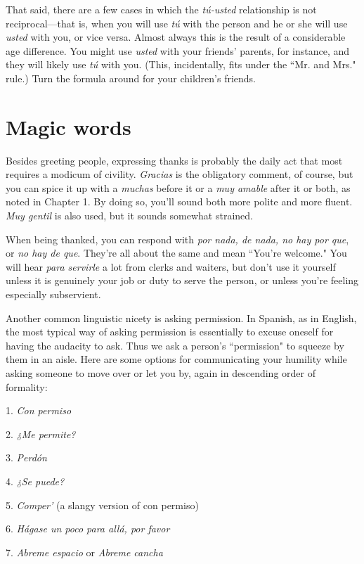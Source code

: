 That said, there are a few cases in which the \emph{tú-usted} relationship is not reciprocal---that is, when you will use \emph{tú} with the person
and he or she will use \emph{usted} with you, or vice versa. Almost always
this is the result of a considerable age difference. You might use \emph{usted}
with your friends' parents, for instance, and they will likely use \emph{tú}
with you. (This, incidentally, fits under the ``Mr. and Mrs." rule.) Turn
the formula around for your children's friends.

\section{Magic words}

Besides greeting people, expressing thanks is probably the
daily act that most requires a modicum of civility. \emph{Gracias} is the
obligatory comment, of course, but you can spice it up with a \emph{muchas}
before it or a \emph{muy amable} after it or both, as noted in Chapter 1. By
doing so, you'll sound both more polite and more fluent. \emph{Muy gentil} is
also used, but it sounds somewhat strained.

When being thanked, you can respond with \emph{por nada, de
	nada, no hay por que}, or \emph{no hay de que}. They're all about the same
and mean ``You're welcome." You will hear \emph{para servirle} a lot from
clerks and waiters, but don't use it yourself unless it is genuinely
your job or duty to serve the person, or unless you're feeling especially subservient.

Another common linguistic nicety is asking permission. In
Spanish, as in English, the most typical way of asking permission is
essentially to excuse oneself for having the audacity to ask. Thus we
ask a person's ``permission" to squeeze by them in an aisle. Here are
some options for communicating your humility while asking someone
to move over or let you by, again in descending order of formality:

\bsk

1. \emph{Con permiso}

2. \emph{¿Me permite?}

3. \emph{Perdón}

4. \emph{¿Se puede?}

5. \emph{Comper'} (a slangy version of con permiso)

6. \emph{Hágase un poco para allá, por favor}

7. \emph{Abreme espacio} or \emph{Abreme cancha}

